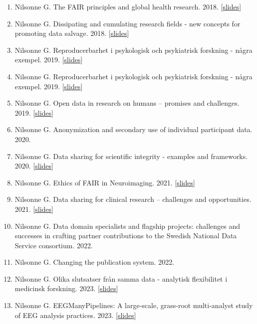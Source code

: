 \documentclass[10pt,a4paper,twocolumn]{article}
\begin{document}
\begin{enumerate}
    \item Nilsonne G. The FAIR principles and global health research. 2018. [\href{https://osf.io/2nxmr/}{slides}]

    \item Nilsonne G. Dissipating and cumulating research fields - new concepts for promoting data salvage. 2018. [\href{https://osf.io/u7z23/}{slides}]

    \item Nilsonne G. Reproducerbarhet i psykologisk och psykiatrisk forskning - några exempel. 2019. [\href{https://osf.io/5nt6s/}{slides}]

    \item Nilsonne G. Reproducerbarhet i psykologisk och psykiatrisk forskning - några exempel. 2019. [\href{https://osf.io/n6mhf/}{slides}]

    \item Nilsonne G. Open data in research on humans – promises and challenges. 2019. [\href{https://osf.io/ja4sr/}{slides}]

    \item Nilsonne G. Anonymization and secondary use of individual participant data. 2020.

    \item Nilsonne G. Data sharing for scientific integrity - examples and frameworks. 2020. [\href{https://osf.io/sz3wn/}{slides}]

    \item Nilsonne G. Ethics of FAIR in Neuroimaging. 2021. [\href{https://osf.io/bswxp/ }{slides}]

    \item Nilsonne G. Data sharing for clinical research – challenges and opportunities. 2021. [\href{https://osf.io/4rgj3/}{slides}]

    \item Nilsonne G. Data domain specialists and flagship projects: challenges and successes in crafting partner contributions to the Swedish National Data Service consortium. 2022.

    \item Nilsonne G. Changing the publication system. 2022.

    \item Nilsonne G. Olika slutsatser från samma data - analytisk flexibilitet i medicinsk forskning. 2023. [\href{https://osf.io/fm7we}{slides}]

    \item Nilsonne G. EEGManyPipelines: A large-scale, grass-root multi-analyst study of EEG analysis practices. 2023. [\href{https://osf.io/zn2vf}{slides}]


\end{enumerate}
\end{document}
